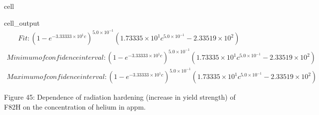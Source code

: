 \documentclass[letterpaper,10pt,english]{jupyterBook}
\begin{document}
\begin{sphinxuseclass}{cell}
\begin{sphinxVerbatimOutput}
\begin{sphinxuseclass}{cell_output}
				\sphinxAtStartPar
				\begin{equation*}
					\begin{split}Fit: \boxed{ \left(1 - e^{- 3.33333 \times 10^{1} c}\right)^{5.0 \times 10^{-1}} \left(1.73335 \times 10^{1} c^{5.0 \times 10^{-1}} - 2.33519 \times 10^{2}\right) }\end{split}
				\end{equation*}\begin{equation*}
					\begin{split}Minimum of confidence interval: \boxed{ \left(1 - e^{- 3.33333 \times 10^{1} c}\right)^{5.0 \times 10^{-1}} \left(1.73335 \times 10^{1} c^{5.0 \times 10^{-1}} - 2.33519 \times 10^{2}\right) }\end{split}
				\end{equation*}\begin{equation*}
					\begin{split}Maximum of confidence interval: \boxed{ \left(1 - e^{- 3.33333 \times 10^{1} c}\right)^{5.0 \times 10^{-1}} \left(1.73335 \times 10^{1} c^{5.0 \times 10^{-1}} - 2.33519 \times 10^{2}\right) }\end{split}
				\end{equation*}
				\noindent{}
				
		\end{sphinxuseclass}\end{sphinxVerbatimOutput}
		
	\end{sphinxuseclass}
	\sphinxAtStartPar
	Figure 45: Dependence of radiation hardening (increase in yield strength) of F82H on the concentration of helium in appm.
	
\end{document}
